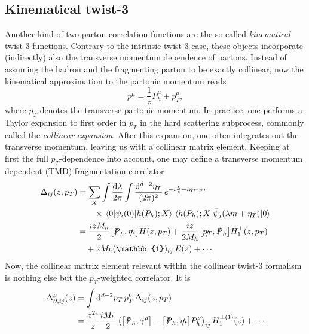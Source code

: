 \subsection{Kinematical twist-3}
Another kind of two-parton correlation functions are the so called \textit{kinematical} twist-3 functions. Contrary to the intrinsic twist-3 case, these objects incorporate (indirectly) also the transverse momentum dependence of partons. Instead of assuming the hadron and the fragmenting parton to be exactly collinear, now the kinematical approximation to the partonic momentum reads
\begin{equation}
    p^\mu = \frac{1}{z}P_h^\mu + p_T^\mu,
\end{equation}
where $p_T$ denotes the transverse partonic momentum. In practice, one performs a Taylor expansion to first order in $p_T$ in the hard scattering subprocess, commonly called the \textit{collinear expansion}. After this expansion, one often integrates out the transverse momentum, leaving us with a collinear matrix element. Keeping at first the full $p_T$-dependence into account, one may define a transverse momentum dependent (TMD) fragmentation correlator
\begin{equation}
    \begin{aligned}
        \Delta_{ij}(z,p_T)&= \sum_X\int\frac{\dd \lambda}{2\pi}\int\frac{\dd^{d-2}\eta_T}{(2\pi)^2} \,e^{-i\frac{\lambda}{z}-i\eta_T\cdot p_T}\\
        &\qquad\times\mel{0}{\psi_i(0)}{h(P_h);X}\mel{h(P_h);X}{\bar \psi_j(\lambda m+\eta_T)}{0}\\
        &= \frac{i z M_h}{2}\comm{\slashed{P}_h}{\slashed{m}}H(z,p_T)+\frac{iz}{2M_h}\comm{\slashed{p_T}}{\slashed{P}_h}H_1^{\perp}(z,p_T)\\
        &\quad +zM_h(\mathbb{1})_{ij}\,E(z)+\cdots 
        \end{aligned}
\end{equation}
Now, the collinear matrix element relevant within the collinear twist-3 formalism is nothing else but the $p_T$-weighted correlator. It is
 \begin{equation}
    \begin{aligned}
        \Delta_{\partial,ij}^\rho(z)&= \int\dd^{d-2}p_T\,p_T^\rho\,\Delta_{ij}(z,p_T)\\
        &=\frac{z^{2\epsilon}}{z}\frac{i M_h}{2}\left(\comm{\slashed{P}_h}{\gamma^\rho}-\comm{\slashed{P}_h}{\slashed{m}}P_h^\rho\right)_{ij}H_1^{\perp(1)}(z)+ \cdots 
        \end{aligned}
\end{equation}




